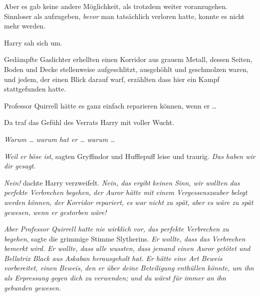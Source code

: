 Aber es gab keine andere Möglichkeit, als trotzdem weiter voranzugehen. Sinnloser als aufzugeben, \emph{bevor} man tatsächlich verloren hatte, konnte es nicht mehr werden.

Harry sah sich um.

Gedämpfte Gaslichter erhellten einen Korridor aus grauem Metall, dessen Seiten, Boden und Decke stellenweise aufgeschlitzt, ausgehöhlt und geschmolzen waren, und jedem, der einen Blick darauf warf, erzählten dass hier ein Kampf stattgefunden hatte.

Professor Quirrell hätte es ganz einfach reparieren können, wenn er …

Da traf das Gefühl des Verrats Harry mit voller Wucht.

\emph{Warum … warum hat er … warum …}

\emph{Weil er böse ist}, sagten Gryffindor und Hufflepuff leise und traurig. \emph{Das haben wir dir gesagt}.

\emph{Nein!} dachte Harry verzweifelt. \emph{Nein, das ergibt keinen Sinn, wir wollten das perfekte Verbrechen begehen, der Auror hätte mit einem Vergessenszauber belegt werden können, der Korridor repariert, es war nicht zu spät, aber es wäre zu spät gewesen, wenn er gestorben wäre!}

\emph{Aber Professor Quirrell hatte nie wirklich vor, das perfekte Verbrechen zu begehen}, sagte die grimmige Stimme Slytherins. \emph{Er wollte, dass das Verbrechen bemerkt wird. Er wollte, dass alle wussten, dass jemand einen Auror getötet und Bellatrix Black aus Askaban herausgeholt hat. Er hätte eine Art Beweis vorbereitet, einen Beweis, den er über deine Beteiligung enthüllen könnte, um ihn als Erpressung gegen dich zu verwenden; und du wärst für immer an ihn gebunden gewesen.}

